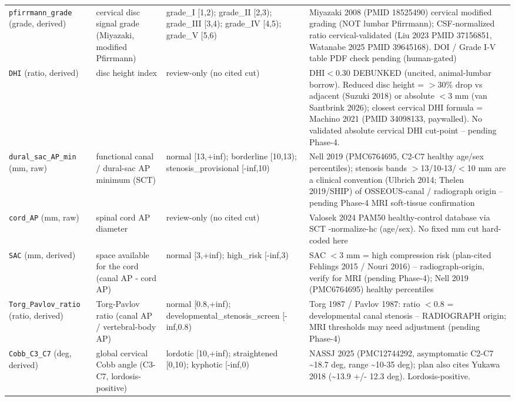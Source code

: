 \begin{center}
\begin{longtable}{p{2.6cm} p{3.3cm} p{4.5cm} p{4.4cm}}
\addlinespace
\texttt{pfirrmann\_grade} (grade, derived) & cervical disc signal grade (Miyazaki, modified Pfirrmann) & grade\_I [1,2); grade\_II [2,3); grade\_III [3,4); grade\_IV [4,5); grade\_V [5,6) & Miyazaki 2008 (PMID 18525490) cervical modified grading (NOT lumbar Pfirrmann); CSF-normalized ratio cervical-validated (Liu 2023 PMID 37156851, Watanabe 2025 PMID 39645168). DOI / Grade I-V table PDF check pending (human-gated) \\
\addlinespace
\texttt{DHI} (ratio, derived) & disc height index & review-only (no cited cut) & DHI$<$0.30 DEBUNKED (uncited, animal-lumbar borrow). Reduced disc height = $>$30\% drop vs adjacent (Suzuki 2018) or absolute $<$3 mm (van Santbrink 2026); closest cervical DHI formula = Machino 2021 (PMID 34098133, paywalled). No validated absolute cervical DHI cut-point -- pending Phase-4. \\
\addlinespace
\texttt{dural\_sac\_AP\_min} (mm, raw) & functional canal / dural-sac AP minimum (SCT) & normal [13,+inf); borderline [10,13); stenosis\_provisional [-inf,10) & Nell 2019 (PMC6764695, C2-C7 healthy age/sex percentiles); stenosis bands $>$13/10-13/$<$10 mm are a clinical convention (Ulbrich 2014; Thelen 2019/SHIP) of OSSEOUS-canal / radiograph origin -- pending Phase-4 MRI soft-tissue confirmation \\
\addlinespace
\texttt{cord\_AP} (mm, raw) & spinal cord AP diameter & review-only (no cited cut) & Valosek 2024 PAM50 healthy-control database via SCT -normalize-hc (age/sex). No fixed mm cut hard-coded here \\
\addlinespace
\texttt{SAC} (mm, derived) & space available for the cord (canal AP - cord AP) & normal [3,+inf); high\_risk [-inf,3) & SAC $<$3 mm = high compression risk (plan-cited Fehlings 2015 / Nouri 2016) -- radiograph-origin, verify for MRI (pending Phase-4); Nell 2019 (PMC6764695) healthy percentiles \\
\addlinespace
\texttt{Torg\_Pavlov\_ratio} (ratio, derived) & Torg-Pavlov ratio (canal AP / vertebral-body AP) & normal [0.8,+inf); developmental\_stenosis\_screen [-inf,0.8) & Torg 1987 / Pavlov 1987: ratio $<$0.8 = developmental canal stenosis -- RADIOGRAPH origin; MRI thresholds may need adjustment (pending Phase-4) \\
\addlinespace
\texttt{Cobb\_C3\_C7} (deg, derived) & global cervical Cobb angle (C3-C7, lordosis-positive) & lordotic [10,+inf); straightened [0,10); kyphotic [-inf,0) & NASSJ 2025 (PMC12744292, asymptomatic C2-C7 \textasciitilde{}18.7 deg, range \textasciitilde{}10-35 deg); plan also cites Yukawa 2018 (\textasciitilde{}13.9 +/- 12.3 deg). Lordosis-positive. \\

\end{longtable}
\end{center}
